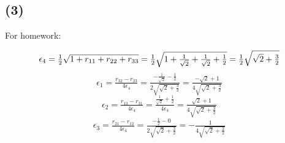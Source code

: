 \documentclass{article}
\begin{document}
\subsection*{(3)}
For homework:
\begin{enumerate}
    \[
        \epsilon_{4} = \tfrac{1}{2} \sqrt{1 + r_{11} + r_{22} + r_{33}} \\
        = \tfrac{1}{2} \sqrt{1 + \tfrac{1}{\sqrt{2}} + \tfrac{1}{\sqrt{2}} + \tfrac{1}{2}}
        = \tfrac{1}{2} \sqrt{\sqrt{2} + \tfrac{3}{2}}
    \]
    \[
        \epsilon_{1} = \tfrac{r_{32} - r_{23}}{4\epsilon_{4}}
        = \tfrac{-\tfrac{1}{\sqrt{2}} - \tfrac{1}{2}}{2\sqrt{\sqrt{2} + \tfrac{3}{2}}}
        = \tfrac{-\sqrt{2} + 1}{4\sqrt{\sqrt{2} + \tfrac{3}{2}}}
    \]
    \[
        \epsilon_{2} = \tfrac{r_{13} - r_{31}}{4\epsilon_{4}}
        = \tfrac{\tfrac{1}{\sqrt{2}} + \tfrac{1}{2}}{4\epsilon_{4}}
        = \tfrac{\sqrt{2} + 1}{4\sqrt{\sqrt{2} + \tfrac{3}{2}}}
    \]
    \[
        \epsilon_{3} = \tfrac{r_{21} - r_{12}}{4\epsilon_{4}}
        = \tfrac{-\tfrac{1}{2}-0}{2\sqrt{\sqrt{2} + \tfrac{3}{2}}}
        = -\tfrac{1}{4\sqrt{\sqrt{2} + \tfrac{3}{2}}}
    \]
\end{enumerate}
\end{document}

